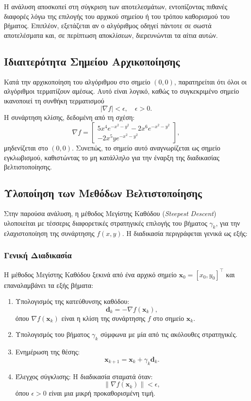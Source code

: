 \documentclass[a4paper,12pt]{report}
\newcommand{\en}{\selectlanguage{english}}
\newcommand{\gr}{\selectlanguage{greek}}
\begin{document}
\hspace{-0.6cm}Η ανάλυση αποσκοπεί στη σύγκριση των αποτελεσμάτων, εντοπίζοντας πιθανές διαφορές λόγω της επιλογής του αρχικού σημείου ή του τρόπου καθορισμού του βήματος. Επιπλέον, εξετάζεται αν ο αλγόριθμος οδηγεί πάντοτε σε σωστά αποτελέσματα και, σε περίπτωση αποκλίσεων, διερευνώνται τα αίτια αυτών.

\subsection*{Ιδιαιτερότητα Σημείου Αρχικοποίησης}

Κατά την αρχικοποίηση του αλγόριθμου στο σημείο \((0, 0)\), παρατηρείται ότι όλοι οι αλγόριθμοι τερματίζουν αμέσως. Αυτό είναι λογικό, καθώς το συγκεκριμένο σημείο ικανοποιεί τη συνθήκη τερματισμού
\[
|\nabla f| < \epsilon, \quad \epsilon > 0.
\]
Η συνάρτηση κλίσης, δεδομένη από τη σχέση:
\[
\nabla f = 
\begin{bmatrix} 
5x^4 e^{-x^2-y^2} - 2x^6 e^{-x^2-y^2} \\ 
-2x^5y e^{-x^2-y^2}
\end{bmatrix},
\]
μηδενίζεται στο \((0, 0)\). Συνεπώς, το σημείο αυτό αναγνωρίζεται ως σημείο εγκλωβισμού, καθιστώντας το μη κατάλληλο για την έναρξη της διαδικασίας βελτιστοποίησης.

\subsection*{Υλοποίηση των Μεθόδων Βελτιστοποίησης}

Στην παρούσα ανάλυση, η μέθοδος Μεγίστης Καθόδου \en (\textit{Steepest Descent}) \gr υλοποιείται με τέσσερις διαφορετικές στρατηγικές επιλογής του βήματος \(\gamma_k\), για την ελαχιστοποίηση της συνάρτησης \(f(x, y)\). Η διαδικασία περιγράφεται γενικά ως εξής:

\subsubsection*{Γενική Διαδικασία}
Η μέθοδος Μεγίστης Καθόδου ξεκινά από ένα αρχικό σημείο \(\mathbf{x}_0 = [x_0, y_0]^\top\) και επαναλαμβάνει τα εξής βήματα:
\begin{enumerate}
    \item Υπολογισμός της κατεύθυνσης καθόδου:
    \[
    \mathbf{d}_k = -\nabla f(\mathbf{x}_k),
    \]
    όπου \(\nabla f(\mathbf{x}_k)\) είναι η κλίση της συνάρτησης \(f\) στο σημείο \(\mathbf{x}_k\).
    \item Υπολογισμός του βήματος \(\gamma_k\) σύμφωνα με μία από τις ακόλουθες στρατηγικές.
    \item Ενημέρωση της θέσης:
    \[
    \mathbf{x}_{k+1} = \mathbf{x}_k + \gamma_k \mathbf{d}_k.
    \]
    \item Έλεγχος σύγκλισης: Η διαδικασία σταματά όταν:
    \[
    \|\nabla f(\mathbf{x}_k)\| < \epsilon,
    \]
    όπου \(\epsilon > 0\) είναι μια μικρή προκαθορισμένη τιμή.
\end{enumerate}
\end{document}
